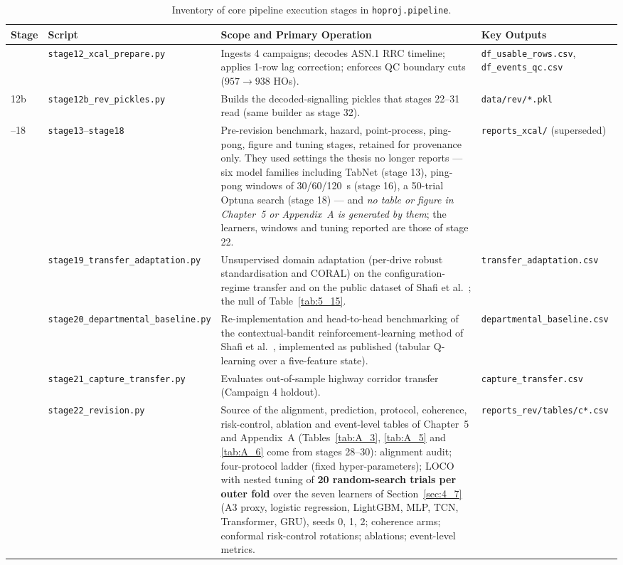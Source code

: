 \begin{table}[htbp]
\centering
\caption{Inventory of core pipeline execution stages in \texttt{hoproj.pipeline}.}
\label{tab:C_pipeline_stages}
\vspace{0.4em}
\singlespacing
\scriptsize
\begin{tabularx}{\linewidth}{>{\raggedright\arraybackslash}p{1.1cm} >{\raggedright\arraybackslash}p{3.6cm} >{\raggedright\arraybackslash}X >{\raggedright\arraybackslash}p{3.2cm}}
\toprule
\textbf{Stage} & \textbf{Script} & \textbf{Scope and Primary Operation} & \textbf{Key Outputs} \\
\midrule
12 & \texttt{stage12\_xcal\_prepare.py} & Ingests 4 campaigns; decodes ASN.1 RRC timeline; applies 1-row lag correction; enforces QC boundary cuts ($957 \rightarrow 938$ HOs). & \texttt{df\_usable\_rows.csv}, \texttt{df\_events\_qc.csv} \\
12b & \texttt{stage12b\_rev\_pickles.py} & Builds the decoded-signalling pickles that stages 22--31 read (same builder as stage 32). & \texttt{data/rev/*.pkl} \\
13--18 & \texttt{stage13}--\texttt{stage18} & Pre-revision benchmark, hazard, point-process, ping-pong, figure and tuning stages, retained for provenance only. They used settings the thesis no longer reports --- six model families including TabNet (stage 13), ping-pong windows of 30/60/120~s (stage 16), a 50-trial Optuna search (stage 18) --- and \emph{no table or figure in Chapter~5 or Appendix~A is generated by them}; the learners, windows and tuning reported are those of stage 22. & \texttt{reports\_xcal/} (superseded) \\
19 & \texttt{stage19\_transfer\_adaptation.py} & Unsupervised domain adaptation (per-drive robust standardisation and CORAL) on the configuration-regime transfer and on the public dataset of Shafi et al.~\cite{ref38}; the null of Table~\ref{tab:5_15}. & \texttt{transfer\_adaptation.csv} \\
20 & \texttt{stage20\_departmental\_baseline.py} & Re-implementation and head-to-head benchmarking of the contextual-bandit reinforcement-learning method of Shafi et al.~\cite{ref39}, implemented as published (tabular Q-learning over a five-feature state). & \texttt{departmental\_baseline.csv} \\
21 & \texttt{stage21\_capture\_transfer.py} & Evaluates out-of-sample highway corridor transfer (Campaign 4 holdout). & \texttt{capture\_transfer.csv} \\
22 & \texttt{stage22\_revision.py} & Source of the alignment, prediction, protocol, coherence, risk-control, ablation and event-level tables of Chapter~5 and Appendix~A (Tables~\ref{tab:A_3}, \ref{tab:A_5} and \ref{tab:A_6} come from stages 28--30): alignment audit; four-protocol ladder (fixed hyper-parameters); LOCO with nested tuning of \textbf{20 random-search trials per outer fold} over the seven learners of Section~\ref{sec:4_7} (A3 proxy, logistic regression, LightGBM, MLP, TCN, Transformer, GRU), seeds 0, 1, 2; coherence arms; conformal risk-control rotations; ablations; event-level metrics. & \texttt{reports\_rev/tables/c*.csv} \\

\end{tabularx}
\end{table}

